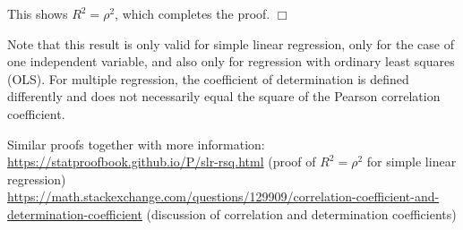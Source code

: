 {%
%
%

This shows $R^2 = \rho^2$, which completes the proof.
\hfill $\Box$ \\
\vspace*{-0.3cm}

Note that this result is only valid for simple linear regression, only for the case of one independent variable, and also only for regression with ordinary least squares (OLS). For multiple regression, the coefficient of determination is defined differently and does not necessarily equal the square of the Pearson correlation coefficient.

Similar proofs together with more information: \\
\url{https://statproofbook.github.io/P/slr-rsq.html} (proof of $R^2 = \rho^2$ for simple linear regression)\\
\url{https://math.stackexchange.com/questions/129909/correlation-coefficient-and-determination-coefficient} (discussion of correlation and determination coefficients)

}
